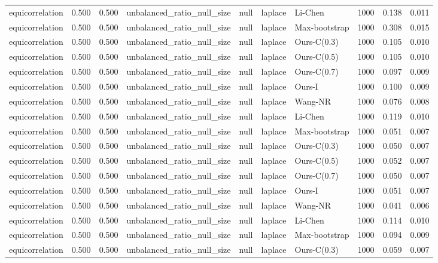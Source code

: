 \begin{tabular}{lrrllllrrr}
equicorrelation & 0.500 & 0.500 & unbalanced\_ratio\_null\_size & null & laplace & Li-Chen & 1000 & 0.138 & 0.011 \\
equicorrelation & 0.500 & 0.500 & unbalanced\_ratio\_null\_size & null & laplace & Max-bootstrap & 1000 & 0.308 & 0.015 \\
equicorrelation & 0.500 & 0.500 & unbalanced\_ratio\_null\_size & null & laplace & Ours-C(0.3) & 1000 & 0.105 & 0.010 \\
equicorrelation & 0.500 & 0.500 & unbalanced\_ratio\_null\_size & null & laplace & Ours-C(0.5) & 1000 & 0.105 & 0.010 \\
equicorrelation & 0.500 & 0.500 & unbalanced\_ratio\_null\_size & null & laplace & Ours-C(0.7) & 1000 & 0.097 & 0.009 \\
equicorrelation & 0.500 & 0.500 & unbalanced\_ratio\_null\_size & null & laplace & Ours-I & 1000 & 0.100 & 0.009 \\
equicorrelation & 0.500 & 0.500 & unbalanced\_ratio\_null\_size & null & laplace & Wang-NR & 1000 & 0.076 & 0.008 \\
equicorrelation & 0.500 & 0.500 & unbalanced\_ratio\_null\_size & null & laplace & Li-Chen & 1000 & 0.119 & 0.010 \\
equicorrelation & 0.500 & 0.500 & unbalanced\_ratio\_null\_size & null & laplace & Max-bootstrap & 1000 & 0.051 & 0.007 \\
equicorrelation & 0.500 & 0.500 & unbalanced\_ratio\_null\_size & null & laplace & Ours-C(0.3) & 1000 & 0.050 & 0.007 \\
equicorrelation & 0.500 & 0.500 & unbalanced\_ratio\_null\_size & null & laplace & Ours-C(0.5) & 1000 & 0.052 & 0.007 \\
equicorrelation & 0.500 & 0.500 & unbalanced\_ratio\_null\_size & null & laplace & Ours-C(0.7) & 1000 & 0.050 & 0.007 \\
equicorrelation & 0.500 & 0.500 & unbalanced\_ratio\_null\_size & null & laplace & Ours-I & 1000 & 0.051 & 0.007 \\
equicorrelation & 0.500 & 0.500 & unbalanced\_ratio\_null\_size & null & laplace & Wang-NR & 1000 & 0.041 & 0.006 \\
equicorrelation & 0.500 & 0.500 & unbalanced\_ratio\_null\_size & null & laplace & Li-Chen & 1000 & 0.114 & 0.010 \\
equicorrelation & 0.500 & 0.500 & unbalanced\_ratio\_null\_size & null & laplace & Max-bootstrap & 1000 & 0.094 & 0.009 \\
equicorrelation & 0.500 & 0.500 & unbalanced\_ratio\_null\_size & null & laplace & Ours-C(0.3) & 1000 & 0.059 & 0.007 \\

\end{tabular}
